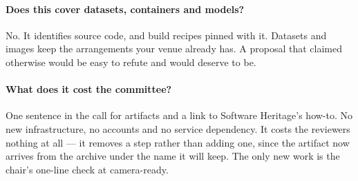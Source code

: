\paragraph{Does this cover datasets, containers and models?}
No. It identifies source code, and build recipes pinned with it. Datasets and images keep the
arrangements your venue already has. A proposal that claimed otherwise would be easy to refute
and would deserve to be.

\paragraph{What does it cost the committee?}
One sentence in the call for artifacts and a link to Software Heritage's how-to. No new
infrastructure, no accounts and no service dependency. It costs the reviewers nothing at all ---
it removes a step rather than adding one, since the artifact now arrives from the archive under
the name it will keep. The only new work is the chair's one-line check at camera-ready.
